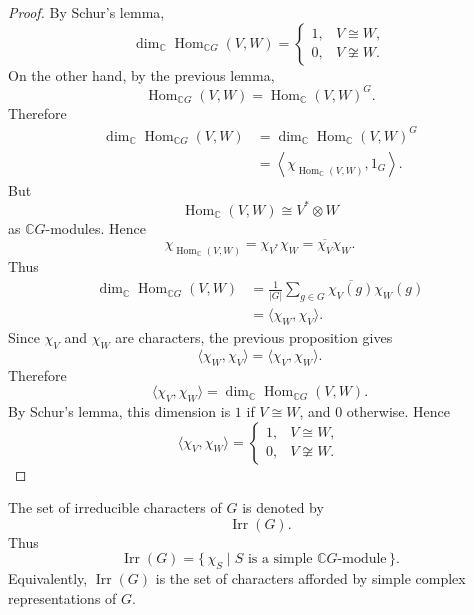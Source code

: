 \begin{proof}
    By Schur's lemma,
    \[
        \dim_{\mathbb{C}}\operatorname{Hom}_{\mathbb{C}G}(V,W)
        =
        \begin{cases}
            1, & V\cong W,     \\
            0, & V\not\cong W.
        \end{cases}
    \]
    On the other hand, by the previous lemma,
    \[
        \operatorname{Hom}_{\mathbb{C}G}(V,W)
        =
        \operatorname{Hom}_{\mathbb{C}}(V,W)^G.
    \]
    Therefore
    \[
        \begin{aligned}
            \dim_{\mathbb{C}}\operatorname{Hom}_{\mathbb{C}G}(V,W)
             & =
            \dim_{\mathbb{C}}\operatorname{Hom}_{\mathbb{C}}(V,W)^G \\
             & =
            \left\langle
            \chi_{\operatorname{Hom}_{\mathbb{C}}(V,W)},
            1_G
            \right\rangle.
        \end{aligned}
    \]
    But
    \[
        \operatorname{Hom}_{\mathbb{C}}(V,W)
        \cong
        V^*\otimes W
    \]
    as \(\mathbb{C}G\)-modules. Hence
    \[
        \chi_{\operatorname{Hom}_{\mathbb{C}}(V,W)}
        =
        \chi_{V^*}\chi_W
        =
        \overline{\chi_V}\chi_W.
    \]
    Thus
    \[
        \begin{aligned}
            \dim_{\mathbb{C}}\operatorname{Hom}_{\mathbb{C}G}(V,W)
             & =
            \frac{1}{|G|}
            \sum_{g\in G}\overline{\chi_V(g)}\chi_W(g) \\
             & =
            \langle \chi_W,\chi_V\rangle.
        \end{aligned}
    \]
    Since \(\chi_V\) and \(\chi_W\) are characters, the previous proposition gives
    \[
        \langle \chi_W,\chi_V\rangle
        =
        \langle \chi_V,\chi_W\rangle.
    \]
    Therefore
    \[
        \langle \chi_V,\chi_W\rangle
        =
        \dim_{\mathbb{C}}\operatorname{Hom}_{\mathbb{C}G}(V,W).
    \]
    By Schur's lemma, this dimension is \(1\) if \(V\cong W\), and \(0\) otherwise.
    Hence
    \[
        \langle \chi_V,\chi_W\rangle
        =
        \begin{cases}
            1, & V\cong W,     \\
            0, & V\not\cong W.
        \end{cases}
    \]
\end{proof}

\begin{definition}
    The set of irreducible characters of \(G\) is denoted by
    \[
        \operatorname{Irr}(G).
    \]
    Thus
    \[
        \operatorname{Irr}(G)
        =
        \{\,\chi_S\mid S \text{ is a simple } \mathbb{C}G\text{-module}\,\}.
    \]
    Equivalently, \(\operatorname{Irr}(G)\) is the set of characters afforded by
    simple complex representations of \(G\).
\end{definition}

